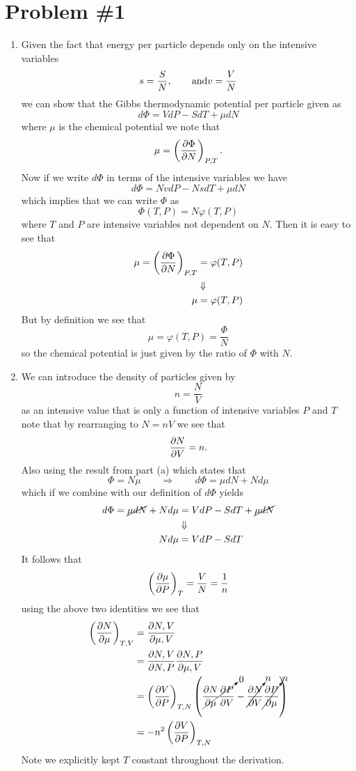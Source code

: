 \documentclass[11pt]{article}
\numberwithin{equation}{section}
\begin{document}


\section{Problem \#1}
\begin{enumerate}[(1)]
\item Given the fact that energy per particle depends only on the intensive variables
$$s = \frac{S}{N},\qquad\textnormal{and}v=\frac{V}{N}$$
we can show that the Gibbs thermodynamic potential per particle given as
$$d\Phi = VdP - SdT + \mu{dN}$$
where $\mu$ is the chemical potential we note that 
$$\mu = \left(\frac{\partial{\Phi}}{\partial{N}}\right)_{P,T}.$$
Now if we write $d\Phi$ in terms of the intensive variables we have
$$d\Phi = NvdP - NsdT + \mu{dN}$$
which implies that we can write $\Phi$ as
$$\Phi(T,P) = N\varphi(T,P)$$
where $T$ and $P$ are intensive variables not dependent on $N$. Then it is easy to see that
\begin{align*}
\mu = \left(\frac{\partial{\Phi}}{\partial{N}}\right)_{P,T} &= \varphi(T,P)\\
&\Downarrow\\
\mu &= \varphi(T,P)
\end{align*}
But by definition we see that
$$\mu = \varphi(T,P) = \frac{\Phi}{N}$$
so the chemical potential is just given by the ratio of $\Phi$ with $N$.

\item We can introduce the density of particles given by
$$n=\frac{N}{V}$$
as an intensive value that is only a function of intensive variables $P$ and $T$ note that
by rearranging to $N = nV$ we see that 
$$\frac{\partial{N}}{\partial{V}} = n.$$ 
Also using the result from part (a) which states that
$$\Phi = N\mu\qquad\Rightarrow\qquad d\Phi = \mu{dN} + Nd\mu$$
which if we combine with our definition of $d\Phi$ yields
\begin{align*}
d\Phi = \cancel{\mu{dN}} + Nd\mu &=  VdP - SdT + \cancel{\mu{dN}}\\
&\Downarrow\\
Nd\mu &=  VdP - SdT 
\end{align*}
It follows that 
$$\left(\frac{\partial{\mu}}{\partial{P}}\right)_{T} = \frac{V}{N} = \frac{1}{n}$$
using the above two identities we see that
\begin{align*}
\left(\frac{\partial{N}}{\partial{\mu}}\right)_{T,V} &= \frac{\partial{N,V}}{\partial{\mu,V}}\\
&= \frac{\partial{N,V}}{\partial{N,P}}\frac{\partial{N,P}}{\partial{\mu,V}}\\
&= \left(\frac{\partial{V}}{\partial{P}}\right)_{T,N}\left(\cancelto{0}{\frac{\partial{N}}{\partial{\mu}}\frac{\partial{P}}{\partial{V}}} - \cancelto{n}{\frac{\partial{N}}{\partial{V}}}\cancelto{n}{\frac{\partial{P}}{\partial{\mu}}}\right)\\
&= -n^2\left(\frac{\partial{V}}{\partial{P}}\right)_{T,N}
\end{align*}
Note we explicitly kept $T$ constant throughout the derivation.
\end{enumerate}
\end{document}
